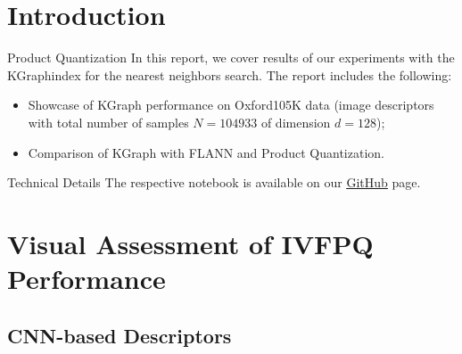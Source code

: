 \section{Introduction}

\begin{frame}
	\begin{block}{Product Quantization}
		In this report, we cover results of our experiments with the KGraph\footnotemark index \cite{Dong2011} for the nearest neighbors search. The report includes the following:
		\begin{itemize}
			\item Showcase of KGraph performance on Oxford105K data (image descriptors with total number of samples $N = 104933$ of dimension $d = 128$);
			\item Comparison of KGraph with FLANN\footnotemark \cite{Muja2009} and Product Quantization\footnotemark \cite{Jegou2011}.
		\end{itemize}
	\end{block}
	
	\begin{block}{Technical Details}
		The respective notebook is available on our \href{https://github.com/salisaresama/computer-vision/blob/master/kgraph.ipynb}{{\color{blue}\underline{GitHub}}} page.
	\end{block}
	
	\addtocounter{footnote}{-3}
\end{frame}


\section{Visual Assessment of IVFPQ Performance}

\subsection{CNN-based Descriptors}

